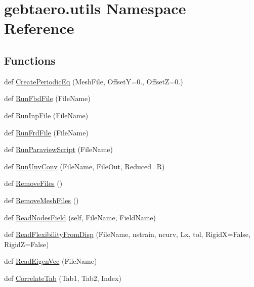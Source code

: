 \hypertarget{namespacegebtaero_1_1utils}{}\section{gebtaero.\+utils Namespace Reference}
\label{namespacegebtaero_1_1utils}
\subsection*{Functions}
\begin{DoxyCompactItemize}
\item 
def \hyperlink{namespacegebtaero_1_1utils_a4f786ecbe66af9f64c802adf4e0a990f}{Create\+Periodic\+Eq} (Mesh\+File, OffsetY=0., OffsetZ=0.)
\item 
def \hyperlink{namespacegebtaero_1_1utils_a37d973efabdd0beca6418265ffa57d32}{Run\+Fbd\+File} (File\+Name)
\item 
def \hyperlink{namespacegebtaero_1_1utils_a74be96ae0691643c4e6c459e14360464}{Run\+Inp\+File} (File\+Name)
\item 
def \hyperlink{namespacegebtaero_1_1utils_a553253bef10c3bec37dc0d858b03dc71}{Run\+Frd\+File} (File\+Name)
\item 
def \hyperlink{namespacegebtaero_1_1utils_a248e0abbec4c02bcb7e75fea0f400c25}{Run\+Paraview\+Script} (File\+Name)
\item 
def \hyperlink{namespacegebtaero_1_1utils_a48c61ad40665ab0b9a682e5bd06f8702}{Run\+Unv\+Conv} (File\+Name, File\+Out, Reduced=\textquotesingle{}R\textquotesingle{})
\item 
def \hyperlink{namespacegebtaero_1_1utils_a14f397a623bb26fcf8b4dcd64228aa05}{Remove\+Files} ()
\item 
def \hyperlink{namespacegebtaero_1_1utils_a8f7dd7932f9ad411a1b153e1e17a4c62}{Remove\+Mesh\+Files} ()
\item 
def \hyperlink{namespacegebtaero_1_1utils_a09e606c50b30d67220853c2340124990}{Read\+Nodes\+Field} (self, File\+Name, Field\+Name)
\item 
def \hyperlink{namespacegebtaero_1_1utils_a2bc8449983854bcc37d204283f55c599}{Read\+Flexibility\+From\+Disp} (File\+Name, nstrain, ncurv, Lx, tol, RigidX=False, RigidZ=False)
\item 
def \hyperlink{namespacegebtaero_1_1utils_aade5b06316b718ab21ed32f4866a21a7}{Read\+Eigen\+Vec} (File\+Name)
\item 
def \hyperlink{namespacegebtaero_1_1utils_a49dfe8af29c3ae64bc75195f0a88a1ce}{Correlate\+Tab} (Tab1, Tab2, Index)
\item 

\end{DoxyCompactItemize}
